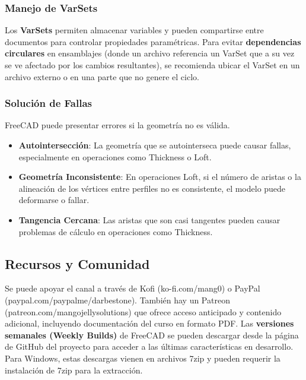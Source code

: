 \documentclass{article}
\begin{document}
\subsubsection*{Manejo de VarSets}
Los \textbf{VarSets} permiten almacenar variables y pueden compartirse entre documentos para controlar propiedades paramétricas. Para evitar \textbf{dependencias circulares} en ensamblajes (donde un archivo referencia un VarSet que a su vez se ve afectado por los cambios resultantes), se recomienda ubicar el VarSet en un archivo externo o en una parte que no genere el ciclo.

\subsubsection*{Solución de Fallas}
FreeCAD puede presentar errores si la geometría no es válida.
\begin{itemize}[noitemsep,topsep=0pt]
    \item \textbf{Autointersección}: La geometría que se autointerseca puede causar fallas, especialmente en operaciones como Thickness o Loft.
    \item \textbf{Geometría Inconsistente}: En operaciones Loft, si el número de aristas o la alineación de los vértices entre perfiles no es consistente, el modelo puede deformarse o fallar.
    \item \textbf{Tangencia Cercana}: Las aristas que son casi tangentes pueden causar problemas de cálculo en operaciones como Thickness.
\end{itemize}

\subsection*{Recursos y Comunidad}
Se puede apoyar el canal a través de Kofi (ko-fi.com/mang0) o PayPal (paypal.com/paypalme/darbestone). También hay un Patreon (patreon.com/mangojellysolutions) que ofrece acceso anticipado y contenido adicional, incluyendo documentación del curso en formato PDF.
Las \textbf{versiones semanales (Weekly Builds)} de FreeCAD se pueden descargar desde la página de GitHub del proyecto para acceder a las últimas características en desarrollo. Para Windows, estas descargas vienen en archivos 7zip y pueden requerir la instalación de 7zip para la extracción.
\end{document}
